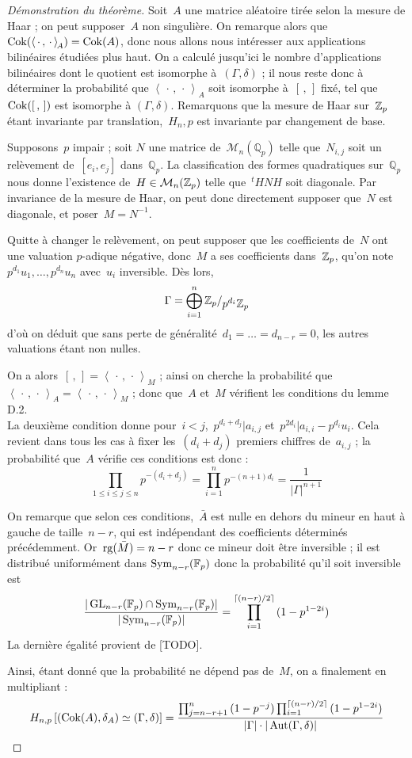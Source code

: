 \begin{proof}[Démonstration du théorème]
Soit~$A$ une matrice aléatoire tirée selon la mesure de Haar ; on peut supposer~$A$ non singulière. On remarque alors que~$\operatorname{Cok}(\left<\,\cdot\,,\,\cdot\,\right>_{\!A}) = \operatorname{Cok}(A)$, donc nous allons nous intéresser aux applications bilinéaires étudiées plus haut.
On a calculé jusqu'ici le nombre d'applications bilinéaires dont le quotient est isomorphe à~$(\Gamma, \delta)$ ; il nous reste donc à déterminer la probabilité que $\left<\,\cdot\,,\,\cdot\,\right>_{\!A}$ soit isomorphe à~$[\,,\,]$ fixé, tel que~$\operatorname{Cok}([\,,\,])$ est isomorphe à $(\Gamma,\delta)$. Remarquons que la mesure de Haar sur~$\mathbb{Z}_p$ étant invariante par translation,~$H_n,p$ est invariante par changement de base.

Supposons~$p$ impair ; soit $N$ une matrice de~$\mathcal{M}_n(\mathbb Q_p)$ telle que~$N_{i,j}$ soit un relèvement de~$[e_i, e_j]$ dans~$\mathbb Q_p$. La classification des formes quadratiques sur~$\mathbb{Q}_p$ nous donne l'existence de~$H\in\mathcal M_n(\mathbb{Z}_p)$ telle que~${}^tHNH$ soit diagonale. Par invariance de la mesure de Haar, on peut donc directement supposer que~$N$ est diagonale, et poser~$M = N^{-1}$.

Quitte à changer le relèvement, on peut supposer que les coefficients de~$N$ ont une valuation $p$-adique négative, donc~$M$ a ses coefficients dans~$\mathbb{Z}_p$, qu'on note~$p^{d_1}u_1, \dots, p^{d_n}u_n$ avec~$u_i$ inversible. Dès lors,
\[ \Gamma = \bigoplus_{i=1}^{n}\quotient{\Zp}{p^{d_i}\Zp} \]
d'où on déduit que sans perte de généralité~$d_1=\dots=d_{n-r}=0$, les autres valuations étant non nulles.

On a alors~$[\,,\,] = \left<\,\cdot\,,\,\cdot\,\right>_{\!M}$ ; ainsi on cherche la probabilité que~$\left<\,\cdot\,,\,\cdot\,\right>_{\!A}=\left<\,\cdot\,,\,\cdot\,\right>_{\!M}$ ; donc que~$A$ et~$M$ vérifient les conditions du lemme D.2.\\
La deuxième condition donne pour~$i<j$,~$p^{d_i+d_j} | a_{i,j}$ et~$p^{2d_i} | a_{i,i}-p^{d_i}u_i$. Cela revient dans tous les cas à fixer les~$(d_i+d_j)$ premiers chiffres de~$a_{i,j}$ ; la probabilité que~$A$ vérifie ces conditions est donc :
\[ \prod_{1\leq i\leq j\leq n}p^{-(d_i+d_j)} = \prod_{i=1}^{n}p^{-(n+1)d_i} = \frac1{|\Gamma|^{n+1}}\]

On remarque que selon ces conditions,~$\bar A$ est nulle en dehors du mineur en haut à gauche de taille~$n-r$, qui est indépendant des coefficients déterminés précédemment. Or~$\operatorname{rg}(\bar M) = n-r$ donc ce mineur doit être inversible ; il est distribué uniformément dans $\operatorname{Sym}_{n-r}(\mathbb F_p)$ donc la probabilité qu'il soit inversible est
\[ \frac{|\operatorname{GL}_{n-r}(\mathbb F_p)\cap \operatorname{Sym}_{n-r}(\mathbb F_p)|}{|\operatorname{Sym}_{n-r}(\mathbb F_p)|}= \prod_{i=1}^{\lceil (n-r)/2\rceil}{(1-p^{1-2i})} \]
La dernière égalité provient de [TODO].

Ainsi, étant donné que la probabilité ne dépend pas de~$M$, on a finalement en multipliant :
\[ H_{n,p}\left[(\operatorname{Cok}(A),\delta_A) \simeq (\Gamma,\delta)\right] = \frac{\prod_{j=n-r+1}^{n}{(1-p^{-j})}\prod_{i=1}^{\lceil (n-r)/2\rceil}{(1-p^{1-2i})}}{|\Gamma|\cdot|\operatorname{Aut}(\Gamma,\delta)|} \]
\end{proof}